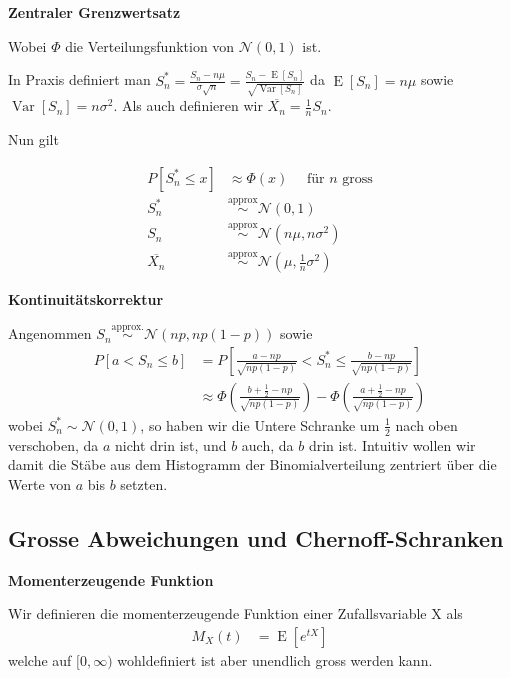 \documentclass[25pt]{sciposter}
\newcommand{\Var}{\operatorname{Var}}
\newcommand{\E}{\operatorname{E}}
\newenvironment{method}[1]{\begin{mdframed}[backgroundcolor=blue!10,innertopmargin=15pt, innerbottommargin=15pt,nobreak=true]
		\textbf{#1 }
	}
	{ 
	\end{mdframed}
}
\newenvironment{thm}[1]{\begin{mdframed}[backgroundcolor=pink!20,innertopmargin=15pt, innerbottommargin=15pt, nobreak=true]
		\textbf{#1 }
	}
	{ 
	\end{mdframed}
}
\begin{document}
\begin{multicols}{3}
\begin{method}{Zentraler Grenzwertsatz}
	Wobei $\Phi$ die Verteilungsfunktion von $\mathcal{N}(0,1)$ ist.	
\end{method}

In Praxis definiert man $S_n^* = \frac{S_n- n\mu}{\sigma \sqrt{n}} = \frac{S_n-\E[S_n]}{\sqrt{\Var[S_n]}}$ da $\E[S_n] = n\mu$ sowie $\Var[S_n] = n\sigma^2$. Als auch definieren wir $\overline{X_n} = \frac{1}{n}S_n$.

Nun gilt

\begin{align*}
	P[S_n^*\leq x] &\approx \Phi(x) \quad \text{ für $n$ gross}\\
	S_n^* &\stackrel{\text{approx}}{\sim} \mathcal{N}(0,1)\\
	S_n &\stackrel{\text{approx}}{\sim} \mathcal{N}(n\mu, n\sigma^2)\\
	\overline{X_n} &\stackrel{\text{approx}}{\sim} \mathcal{N}(\mu, \frac{1}{n}\sigma^2)
\end{align*}


\begin{thm}{Kontinuitätskorrektur}
	
	
	Angenommen $S_n \stackrel{\text{approx.}}{\sim} \mathcal{N}(np,np(1-p))$ sowie
	\begin{align*}
		P\left[ a < S_n  \leq b \right] &= P\left[ \frac{a-np}{ \sqrt{np(1-p)}} < S_n^* \leq \frac{b-np}{\sqrt{np(1-p)}} \right]\\
		&\approx \Phi \left(\frac{b+\frac{1}{2} - np}{\sqrt{np(1-p)}}\right) - \Phi \left(\frac{a+\frac{1}{2} - np}{\sqrt{np(1-p)}}\right)
	\end{align*}
	wobei $S^*_n \sim \mathcal{N}(0,1)$, so haben wir die Untere Schranke um $\frac{1}{2}$ nach oben verschoben, da $a$ nicht drin ist, und $b$ auch, da $b$ drin ist. Intuitiv wollen wir damit die Stäbe aus dem Histogramm der Binomialverteilung zentriert über die Werte von $a$ bis $b$ setzten.
\end{thm}


\subsection*{Grosse Abweichungen und Chernoff-Schranken}


\begin{method}{Momenterzeugende Funktion}
	Wir definieren die momenterzeugende Funktion einer Zufallsvariable X als
	\begin{align*}
		M_X(t) &= \E\left[e^{tX}\right]
	\end{align*}
	welche auf $[0,\infty)$ wohldefiniert ist aber unendlich gross werden kann.
	

\end{method}
\end{multicols}
\end{document}
